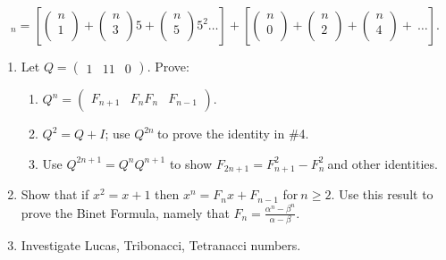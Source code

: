 \documentclass[10pt,letter]{article}
\begin{document}
\[
_{n} = \left\lbrack \begin{pmatrix}
n \\
1 \\
\end{pmatrix} + \begin{pmatrix}
n \\
3 \\
\end{pmatrix}5 + \begin{pmatrix}
n \\
5 \\
\end{pmatrix}5^{2}\ldots \right\rbrack + \left\lbrack \begin{pmatrix}
n \\
0 \\
\end{pmatrix} + \begin{pmatrix}
n \\
2 \\
\end{pmatrix} + \begin{pmatrix}
n \\
4 \\
\end{pmatrix} + \ \ldots \right\rbrack.
\]
\begin{enumerate}
\def\labelenumi{\arabic{enumi}.}

\item
  Let \(Q =
\begin{pmatrix}
  1 & 1
  1 & 0
  \end{pmatrix}
\). Prove:
\begin{enumerate}
  \def\labelenumii{\alph{enumii}.}

  \item
    \(Q^{n} =
\begin{pmatrix}
    F_{n + 1} & F_{n}
    F_{n} & F_{n - 1}
    \end{pmatrix}
\).
  \item
    \(Q^{2} = Q + I\); use \(Q^{2n}\ \)to prove the identity in \#4.
  \item
    Use \(Q^{2n + 1} = Q^{n}Q^{n + 1}\) to show
    \(F_{2n + 1} = F_{n + 1}^{2} - F_{n}^{2}\ \)and other identities.

\end{enumerate}
\item
  Show that if \(x^{2} = x + 1\) then \(x^{n} = F_{n}x + F_{n - 1}\)
  for\(\ n \geq 2\). Use this result to prove the Binet Formula, namely
  that \(F_{n} = \frac{\alpha^{n} - \beta^{n}}{\alpha - \beta}\).
\item
  Investigate Lucas, Tribonacci, Tetranacci numbers.

\end{enumerate}
\end{document}
